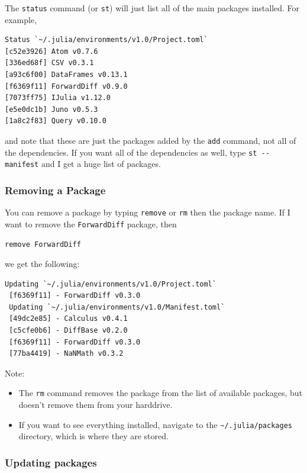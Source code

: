 The \texttt{status} command (or \texttt{st}) will just list all of the
main packages installed. For example,

\begin{verbatim}
Status `~/.julia/environments/v1.0/Project.toml`
[c52e3926] Atom v0.7.6
[336ed68f] CSV v0.3.1
[a93c6f00] DataFrames v0.13.1
[f6369f11] ForwardDiff v0.9.0
[7073ff75] IJulia v1.12.0
[e5e0dc1b] Juno v0.5.3
[1a8c2f83] Query v0.10.0
\end{verbatim}

and note that these are just the packages added by the \texttt{add}
command, not all of the dependencies. If you want all of the
dependencies as well, type \texttt{st\ -\/-manifest} and I get a huge
list of packages.

\hypertarget{removing-a-package}{%
\subsubsection{Removing a Package}\label{removing-a-package}}

You can remove a package by typing \texttt{remove} or \texttt{rm} then
the package name. If I want to remove the \texttt{ForwardDiff} package,
then

\begin{verbatim}
remove ForwardDiff
\end{verbatim}

we get the following:

\begin{verbatim}
Updating `~/.julia/environments/v1.0/Project.toml`
 [f6369f11] - ForwardDiff v0.3.0
 Updating `~/.julia/environments/v1.0/Manifest.toml`
 [49dc2e85] - Calculus v0.4.1
 [c5cfe0b6] - DiffBase v0.2.0
 [f6369f11] - ForwardDiff v0.3.0
 [77ba4419] - NaNMath v0.3.2
\end{verbatim}

Note:

\begin{itemize}

\item
  The \texttt{rm} command removes the package from the list of available
  packages, but doesn't remove them from your harddrive.
\item
  If you want to see everything installed, navigate to the
  \texttt{\textasciitilde{}/.julia/packages} directory, which is where
  they are stored.
\end{itemize}

\hypertarget{updating-packages}{%
\subsubsection{Updating packages}\label{updating-packages}}

